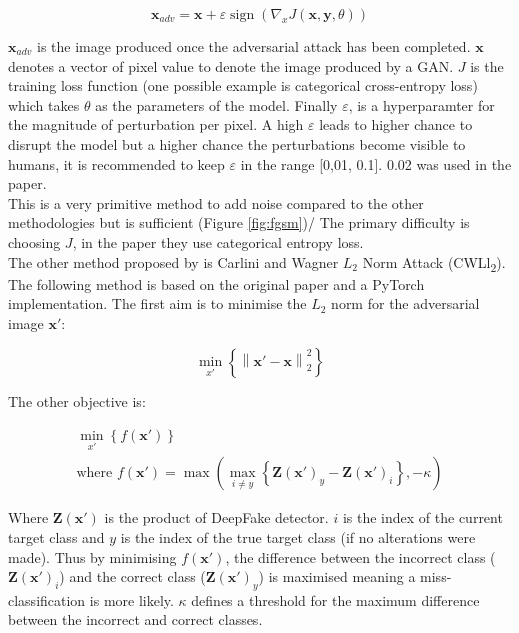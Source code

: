 \documentclass{article}
\begin{document}
\begin{equation}
    \mathbf{x}_{adv} = \mathbf{x} + \varepsilon \operatorname{sign} (\nabla _x J( \mathbf{x},\mathbf{y}, \theta ))
\end{equation}

$\mathbf{x}_{adv}$ is the image produced once the adversarial attack has been completed. $\mathbf{x}$ denotes a vector of pixel value to denote the image produced by a GAN. $J$ is the training loss function (one possible example is categorical cross-entropy loss) which takes $\theta$ as the parameters of the model. Finally $\varepsilon$, is a hyperparamter for the magnitude of perturbation per pixel. A high $\varepsilon$ leads to higher chance to disrupt the model but a higher chance the perturbations become visible to humans, it is recommended to keep $\varepsilon$ in the range [0,01, 0.1]. 0.02 was used in the paper\cite{pertubations}.\\

This is a very primitive method to add noise compared to the other methodologies but is sufficient (Figure \ref{fig:fgsm})/ The primary difficulty is choosing $J$, in the paper they use categorical entropy loss.\\

The other method proposed by \cite{pertubations} is Carlini and Wagner $L_2$ Norm Attack (CWLl\textsubscript{2}). The following method is based on the original paper\cite{carlini2017towards} and a PyTorch implementation\cite{cwl2python}. The first aim is to minimise the $L_2$ norm for the adversarial image $\mathbf{x}'$:

\begin{equation}
\label{eq:l2_norm}
    \mathop {\min} \limits_{x'} \left\{ \left\| \mathbf{x}' - \mathbf{x} \right\|_2^2 \right\}
\end{equation}

The other objective is:

\begin{equation}
\label{eq:min_f(x')}
\begin{array}{c} 
    \mathop {\min} \limits_{x'} \left\{ f\left( \mathbf{x}' \right) \right\} \\
    \text{where } f\left( \mathbf{x}' \right) = \max \left( \max_{i \ne y} \left\{ \mathbf{Z} \left( \mathbf{x}' \right)_y - \mathbf{Z} \left( \mathbf{x}' \right)_i \right\}, - \kappa \right)
\end{array}
\end{equation}

Where $\mathbf{Z}(\mathbf{x}')$ is the product of DeepFake detector. $i$ is the index of the current target class and $y$ is the index of the true target class (if no alterations were made). Thus by minimising $f(\mathbf{x}')$, the difference between the incorrect class ($\mathbf{Z}{{\left( {{\mathbf{x}}'} \right)}_i}$) and the correct class (${\mathbf{Z}}{{\left( {{\mathbf{x}}'} \right)}_y}$) is maximised meaning a miss-classification is more likely. $\kappa$ defines a threshold for the maximum difference between the incorrect and correct classes.\\
\end{document}
